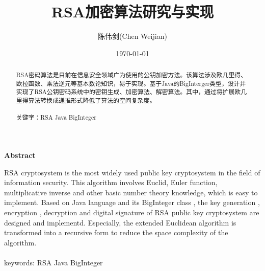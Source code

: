 \documentclass[UTF8,a4paper,11pt]{ctexart}
\title{\textbf{\Large{RSA加密算法研究与实现}}}
\author{ 陈伟剑(Chen Weijian) }
\date{\today}
\begin{document}
 
\maketitle
 
\begin{abstract}
	RSA密码算法是目前在信息安全领域广为使用的公钥加密方法。该算法涉及欧几里得、欧拉函数、乘法逆元等基本数论知识，易于实现。基于Java的BigInterger类型，设计并实现了RSA公钥密码系统中的密钥生成、加密算法、解密算法。其中，通过将扩展欧几里得算法转换成递推形式降低了算法的空间复杂度。
\\
\\
	关键字：RSA  \space\space Java \space\space BigInteger
\end{abstract}
 
\begin{center}
\large{\textbf{Abstract}}
\end{center}
 
\begin{adjustwidth}{1cm}{1cm}
\hspace{1.5em}RSA cryptosystem is the most widely used public key cryptosystem in the field of information security. This algorithm involves Euclid, Euler function, multiplicative inverse and other basic number theory knowledge, which is easy to implement. Based on Java language and its BigInteger class , the key generation , encryption , decryption and digital signature of RSA public key cryptosystem are designed and implementd. Especially, the extended Euclidean algorithm is transformed into a recursive form to reduce the space complexity of the algorithm. 
 \\
\\
\noindent\hspace{1.5em}keywords: RSA \space\space  Java \space\space   BigInteger
\end{adjustwidth}
 
\thispagestyle{empty}       %
\newpage                    %

\tableofcontents
\newpage
\setcounter{page}{1}        %
 
 
\end{document}
